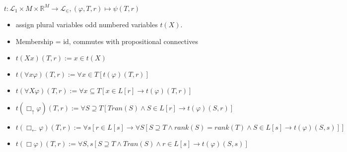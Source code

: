 \documentclass{article}
\theoremstyle{definition}
\newcommand{\bu}{\Box_\uparrow}
\newcommand{\bl}{\Box_\leftarrow}
\begin{document}
$t : \mathcal{L}_1 \times M \times \mathbb{R}^M \to \mathcal{L}_\in, (\varphi, T, r) \mapsto \psi(T, r)$
\begin{itemize}
    \item assign plural variables odd numbered variables $t(X)$.
    \item Membership = id, commutes with propositional connectives 
    \item $t(Xx)(T, r) := x \in t(X)$
    \item $t(\forall x \varphi)(T, r) := \forall x \in T [t(\varphi)(T, r)]$
    \item $t(\forall X \varphi)(T, r) := \forall x \subseteq T [x \in L[r] \rightarrow t(\varphi)(T, r)]$
    \item $t(\bu \varphi)(T, r) := \forall S \supseteq T [Tran(S) \wedge S \in L[r] \rightarrow t(\varphi)(S, r)]$
    \item $t(\bl \varphi)(T, r) := \forall s[ r \in L[s] \rightarrow \forall S[ S \supseteq T \wedge rank(S) = rank(T) \wedge S \in L[s] \rightarrow t(\varphi)(S, s)]]$
    \item $t(\Box \varphi)(T, r) := \forall S, s[S \supseteq T \wedge Tran(S) \wedge r \in L[s] \rightarrow t(\varphi)(S, s) ]$
\end{itemize}
\end{document}
